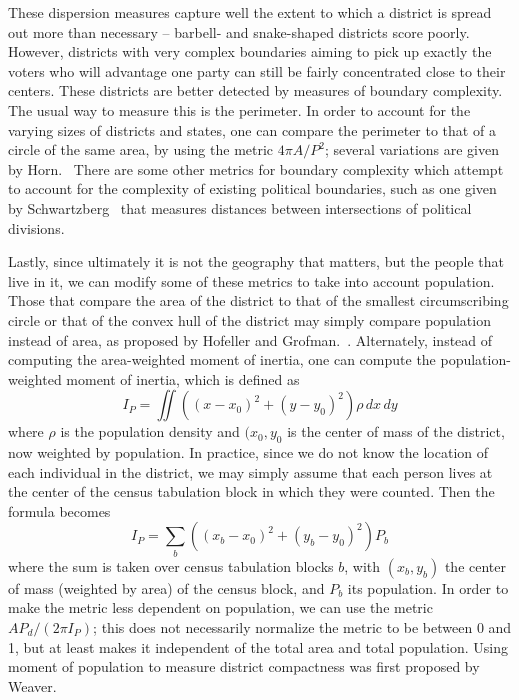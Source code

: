\documentclass[12pt]{article}
\begin{document}
  These dispersion measures capture well the extent to which a district is spread out more than necessary -- barbell- and snake-shaped districts score poorly.  However, districts with very complex boundaries aiming to pick up exactly the voters who will advantage one party can still be fairly concentrated close to their centers.  These districts are better detected by measures of boundary complexity.  The usual way to measure this is the perimeter.  In order to account for the varying sizes of districts and states, one can compare the perimeter to that of a circle of the same area, by using the metric $4\pi A/P^2$; several variations are given by Horn.~\cite{horn}  There are some other metrics for boundary complexity which attempt to account for the complexity of existing political boundaries, such as one given by Schwartzberg~\cite{schwartzberg} that measures distances between intersections of political divisions.

  Lastly, since ultimately it is not the geography that matters, but the people that live in it, we can modify some of these metrics to take into account population.  Those that compare the area of the district to that of the smallest circumscribing circle or that of the convex hull of the district may simply compare population instead of area, as proposed by Hofeller and Grofman.~\cite{hofeller}.  Alternately, instead of computing the area-weighted moment of inertia, one can compute the population-weighted moment of inertia, which is defined as
  \[I_P = \iint \left((x-x_0)^2 + (y-y_0)^2\right) \rho\, dx\, dy \]
  where $\rho$ is the population density and $(x_0, y_0$ is the center of mass of the district, now weighted by population.  In practice, since we do not know the location of each individual in the district, we may simply assume that each person lives at the center of the census tabulation block in which they were counted.  Then the formula becomes
  \[I_P = \sum_{b} \left((x_b-x_0)^2 + (y_b-y_0)^2\right) P_b\]
  where the sum is taken over census tabulation blocks $b$, with $(x_b, y_b)$ the center of mass (weighted by area) of the census block, and $P_b$ its population.  In order to make the metric less dependent on population, we can use the metric $AP_d/(2\pi I_P)$; this does not necessarily normalize the metric to be between 0 and 1, but at least makes it independent of the total area and total population.  Using moment of population to measure district compactness was first proposed by Weaver.~\cite{weaver}
\end{document}
